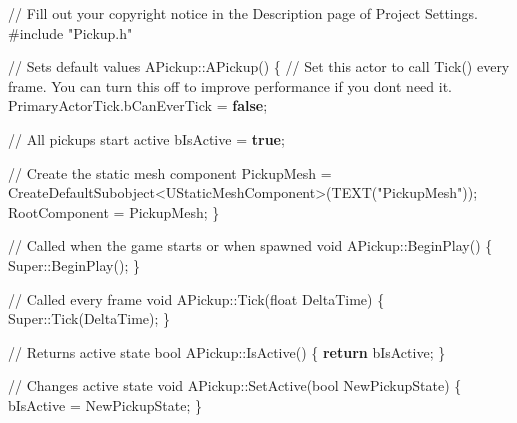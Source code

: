 \documentclass[
  letterpaper,
  DIV=11,
  numbers=noendperiod]{scrartcl}
\newenvironment{Shaded}{\begin{snugshade}}{\end{snugshade}}
\newcommand{\CommentTok}[1]{\textcolor[rgb]{0.37,0.37,0.37}{#1}}
\newcommand{\ControlFlowTok}[1]{\textcolor[rgb]{0.00,0.23,0.31}{\textbf{#1}}}
\newcommand{\DataTypeTok}[1]{\textcolor[rgb]{0.68,0.00,0.00}{#1}}
\newcommand{\ImportTok}[1]{\textcolor[rgb]{0.00,0.46,0.62}{#1}}
\newcommand{\KeywordTok}[1]{\textcolor[rgb]{0.00,0.23,0.31}{\textbf{#1}}}
\newcommand{\NormalTok}[1]{\textcolor[rgb]{0.00,0.23,0.31}{#1}}
\newcommand{\OperatorTok}[1]{\textcolor[rgb]{0.37,0.37,0.37}{#1}}
\newcommand{\PreprocessorTok}[1]{\textcolor[rgb]{0.68,0.00,0.00}{#1}}
\newcommand{\StringTok}[1]{\textcolor[rgb]{0.13,0.47,0.30}{#1}}
\begin{document}
\begin{Shaded}
\begin{Highlighting}[]
\CommentTok{// Fill out your copyright notice in the Description page of Project Settings.}
\PreprocessorTok{\#include }\ImportTok{"Pickup.h"}

\CommentTok{// Sets default values}
\NormalTok{APickup}\OperatorTok{::}\NormalTok{APickup}\OperatorTok{()}
\OperatorTok{\{}
    \CommentTok{// Set this actor to call Tick() every frame. You can turn this off to improve performance if you don\textquotesingle{}t need it.}
\NormalTok{    PrimaryActorTick}\OperatorTok{.}\NormalTok{bCanEverTick }\OperatorTok{=} \KeywordTok{false}\OperatorTok{;}
    
    \CommentTok{// All pickups start active}
\NormalTok{    bIsActive }\OperatorTok{=} \KeywordTok{true}\OperatorTok{;}
    
    \CommentTok{// Create the static mesh component}
\NormalTok{    PickupMesh }\OperatorTok{=}\NormalTok{ CreateDefaultSubobject}\OperatorTok{\textless{}}\NormalTok{UStaticMeshComponent}\OperatorTok{\textgreater{}(}\NormalTok{TEXT}\OperatorTok{(}\StringTok{"PickupMesh"}\OperatorTok{));}
\NormalTok{    RootComponent }\OperatorTok{=}\NormalTok{ PickupMesh}\OperatorTok{;}
\OperatorTok{\}}

\CommentTok{// Called when the game starts or when spawned}
\DataTypeTok{void}\NormalTok{ APickup}\OperatorTok{::}\NormalTok{BeginPlay}\OperatorTok{()}
\OperatorTok{\{}
\NormalTok{    Super}\OperatorTok{::}\NormalTok{BeginPlay}\OperatorTok{();}
\OperatorTok{\}}

\CommentTok{// Called every frame}
\DataTypeTok{void}\NormalTok{ APickup}\OperatorTok{::}\NormalTok{Tick}\OperatorTok{(}\DataTypeTok{float}\NormalTok{ DeltaTime}\OperatorTok{)}
\OperatorTok{\{}
\NormalTok{    Super}\OperatorTok{::}\NormalTok{Tick}\OperatorTok{(}\NormalTok{DeltaTime}\OperatorTok{);}
\OperatorTok{\}}

\CommentTok{// Returns active state}
\DataTypeTok{bool}\NormalTok{ APickup}\OperatorTok{::}\NormalTok{IsActive}\OperatorTok{()}
\OperatorTok{\{}
    \ControlFlowTok{return}\NormalTok{ bIsActive}\OperatorTok{;}
\OperatorTok{\}}

\CommentTok{// Changes active state}
\DataTypeTok{void}\NormalTok{ APickup}\OperatorTok{::}\NormalTok{SetActive}\OperatorTok{(}\DataTypeTok{bool}\NormalTok{ NewPickupState}\OperatorTok{)}
\OperatorTok{\{}
\NormalTok{    bIsActive }\OperatorTok{=}\NormalTok{ NewPickupState}\OperatorTok{;}
\OperatorTok{\}}
\end{Highlighting}
\end{Shaded}
\end{document}
